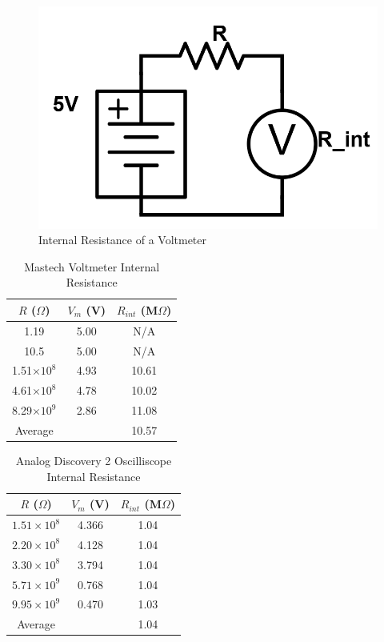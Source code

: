 \documentclass{article}
\renewcommand{\O}{\(\Omega\)}
\begin{document}
    \begin{figure}
        \centering
        \includegraphics[width=0.4\linewidth]{vm.png}
        \caption{Internal Resistance of a Voltmeter}
    \end{figure}
    
    \begin{table}[H]
        \centering
        \begin{tabular}{c|c|c}
            \(R\) (\O)& \(V_m\) (V) & \(R_{int}\) (M\O)\\
            \hline
            1.19 & 5.00 & N/A\\
            10.5 & 5.00 & N/A\\
            1.51\(\times 10^8\) & 4.93  & 10.61 \\
            4.61\(\times 10^8\) & 4.78 & 10.02 \\
            8.29\(\times 10^{9}\) & 2.86 & 11.08 \\
            \hline
            Average & & 10.57 
        \end{tabular}
        \caption{Mastech Voltmeter Internal Resistance}
    \end{table}

    \begin{table}[H]
        \centering
        \begin{tabular}{c|c|c}
            \(R\) (\O) & \(V_m\) (V) & \(R_{int}\) (M\O)\\
            \hline
            \(1.51\times 10^{8}\) & 4.366 & 1.04\\
            \(2.20\times 10^{8}\) & 4.128 & 1.04\\
            \(3.30\times 10^{8}\) & 3.794 & 1.04\\
            \(5.71\times 10^{9}\) & 0.768 & 1.04\\
            \(9.95\times 10^{9}\) & 0.470 & 1.03\\
            \hline
            Average & & 1.04
        \end{tabular}
        \caption{Analog Discovery 2 Oscilliscope Internal Resistance}
    \end{table}
\end{document}
